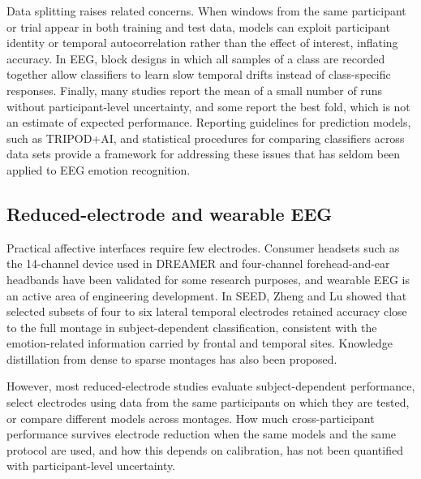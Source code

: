 Data splitting raises related concerns. When windows from the same participant or trial appear in both training and test data, models can exploit participant identity or temporal autocorrelation rather than the effect of interest, inflating accuracy\cite{saeb,kapoor}. In EEG, block designs in which all samples of a class are recorded together allow classifiers to learn slow temporal drifts instead of class-specific responses\cite{liblock}. Finally, many studies report the mean of a small number of runs without participant-level uncertainty, and some report the best fold, which is not an estimate of expected performance. Reporting guidelines for prediction models, such as TRIPOD+AI\cite{tripod}, and statistical procedures for comparing classifiers across data sets\cite{demsar} provide a framework for addressing these issues that has seldom been applied to EEG emotion recognition.


\subsection{Reduced-electrode and wearable EEG}
Practical affective interfaces require few electrodes. Consumer headsets such as the 14-channel device used in DREAMER\cite{dreamer} and four-channel forehead-and-ear headbands have been validated for some research purposes\cite{krigolson}, and wearable EEG is an active area of engineering development\cite{casson}. In SEED, Zheng and Lu showed that selected subsets of four to six lateral temporal electrodes retained accuracy close to the full montage in subject-dependent classification\cite{seed}, consistent with the emotion-related information carried by frontal and temporal sites\cite{davidson,coan}. Knowledge distillation from dense to sparse montages has also been proposed\cite{hinton}.

However, most reduced-electrode studies evaluate subject-dependent performance, select electrodes using data from the same participants on which they are tested, or compare different models across montages. How much cross-participant performance survives electrode reduction when the same models and the same protocol are used, and how this depends on calibration, has not been quantified with participant-level uncertainty.


